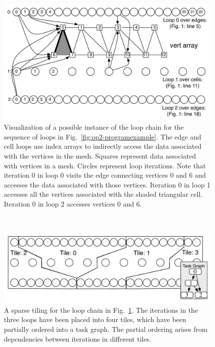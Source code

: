 \begin{figure}[t]
\centering
\includegraphics[scale=0.5]{sparsetiling/figures/tiling_example.pdf}
\caption{Visualization of a possible instance of the loop chain for the sequence of loops in Fig.~\ref{fig:op2-programexample}. The edge and cell loops use index arrays to indirectly access the data associated with the vertices in the mesh. Squares represent data associated with vertices in a mesh. Circles represent loop iterations. Note that iteration 0 in loop 0 visits the edge connecting vertices 0 and 6 and accesses the data associated with those vertices. Iteration 0 in loop 1 accesses all the vertices associated with the shaded triangular cell. Iteration 0 in loop 2 accesses vertices 0 and 6.}
\label{fig:loopchain}	
\end{figure}
~
\begin{figure}[t]
 \centering
		\includegraphics[scale=0.5]{sparsetiling/figures/tiling_example_tiled.pdf}
\caption{A sparse tiling for the loop chain in Fig.~\ref{fig:loopchain}.  The iterations
in the three loops have been placed into four tiles, which have been partially ordered
into a task graph.  The partial ordering arises from dependencies between iterations
in different tiles.}
\label{fig:fstOnOp2}	
\end{figure}
~

